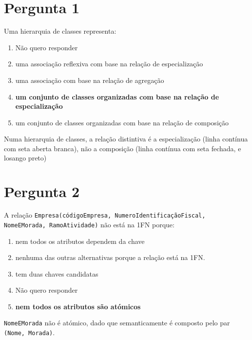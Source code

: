 \documentclass[type=recurso, year=2015/16]{bdad_exam}
\begin{document}
{
\renewcommand{\thechapter}{\arabic{chapter}R}
\setcounter{chapter}{15}
\section{Pergunta 1}
Uma hierarquia de classes representa:
\begin{enumerate}[label=\alph*.]\itemsep0em
    \item Não quero responder
    \item uma associação reflexiva com base na relação de especialização
    \item uma associação com base na relação de agregação
    \item \textbf{um conjunto de classes organizadas com base na relação de especialização \greencheckmark}
    \item um conjunto de classes organizadas com base na relação de composição
\end{enumerate}
Numa hierarquia de classes, a relação distintiva é a especialização (linha contínua com seta aberta branca), não a composição (linha contínua com seta fechada, e losango preto)

\section{Pergunta 2}
A relação \texttt{Empresa(códigoEmpresa, NumeroIdentificaçãoFiscal, NomeEMorada, RamoAtividade)} não está na 1FN porque:
\begin{enumerate}[label=\alph*.]\itemsep0em
    \item nem todos os atributos dependem da chave
    \item nenhuma das outras alternativas porque a relação está na 1FN.
    \item tem duas chaves candidatas
    \item Não quero responder
    \item \textbf{nem todos os atributos são atómicos \greencheckmark}
\end{enumerate}
\texttt{NomeEMorada} não é atómico, dado que semanticamente é composto pelo par \texttt{(Nome, Morada)}.

}
\end{document}
